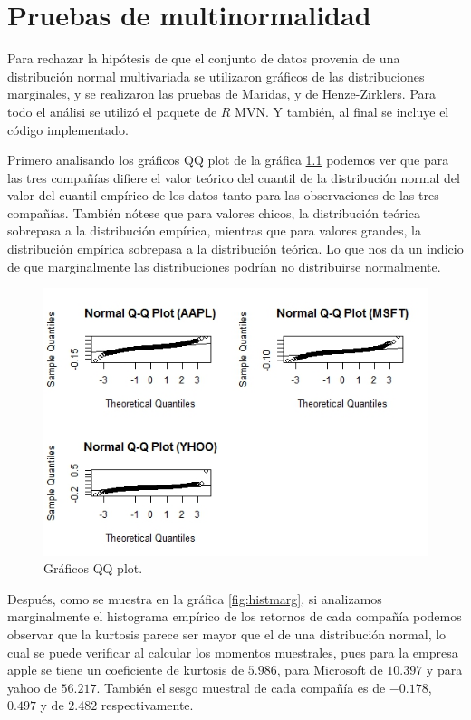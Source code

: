 \chapter{Pruebas de multinormalidad}
Para rechazar la hipótesis de que el conjunto de datos provenia de una distribución normal multivariada se utilizaron gráficos de las distribuciones marginales, y se 
realizaron las pruebas de Maridas, y de Henze-Zirklers. Para todo el análisi se utilizó el paquete de $R$ MVN. Y también, al final se incluye el código implementado.

Primero analisando los gráficos QQ plot de la gráfica \ref{fig:qqplot} podemos ver que para las tres compañías difiere el valor teórico del cuantil de la distribución normal del valor del cuantil empírico de los datos tanto para las observaciones de las tres compañías. También nótese que para valores chicos, la distribución teórica sobrepasa a la distribución empírica, mientras que para valores grandes, la distribución empírica sobrepasa a la distribución teórica. Lo que nos da un indicio de que marginalmente las distribuciones podrían no distribuirse normalmente.

\begin{figure}[h]
	\centering
	\includegraphics[width=1\linewidth]{Figuras/QQplot}
	\caption[Gráficos QQ]{Gráficos QQ plot.}
	\label{fig:qqplot}
\end{figure}
 
 Después, como se muestra en la gráfica \ref*{fig:histmarg}, si analizamos marginalmente el histograma empírico de los retornos de cada compañía podemos observar que la kurtosis parece ser mayor que el de una distribución normal, lo cual se puede verificar al calcular los momentos muestrales, pues para la empresa apple se tiene un coeficiente de kurtosis de $5.986$, para Microsoft de $10.397$ y para yahoo de $56.217$. También el sesgo muestral de cada compañía es de $-0.178$, $0.497$ y de $2.482$ respectivamente.  
 
